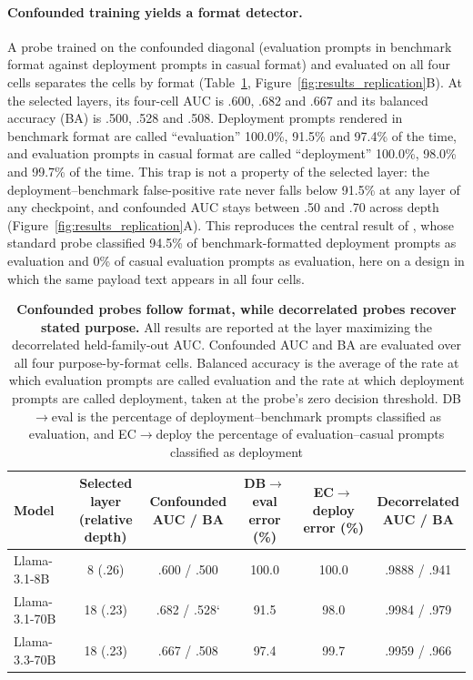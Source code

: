 \documentclass{article}
\begin{document}
\paragraph{Confounded training yields a format detector.}
A probe trained on the confounded diagonal (evaluation prompts
in benchmark format against deployment prompts in casual format) and evaluated
on all four cells separates the cells by format (Table~\ref{tab:probe_comparison}, Figure~\ref{fig:results_replication}B).
At the selected layers, its four-cell AUC is .600, .682 and .667 and its
balanced accuracy (BA) is .500, .528 and .508. Deployment prompts rendered in
benchmark format are called ``evaluation'' 100.0\%, 91.5\% and 97.4\% of the
time, and evaluation prompts in casual format are called ``deployment''
100.0\%, 98.0\% and 99.7\% of the time. This trap is not a property of the
selected layer: the deployment--benchmark false-positive rate never falls
below 91.5\% at any layer of any checkpoint, and confounded AUC stays between
.50 and .70 across depth (Figure~\ref{fig:results_replication}A). This
reproduces the central result of \cite{devbunova2026format}, whose
standard probe classified 94.5\% of benchmark-formatted deployment prompts as
evaluation and 0\% of casual evaluation prompts as evaluation, here on a design
in which the same payload text appears in all four cells.

\begin{table}[ht]
\centering
\small
\setlength{\tabcolsep}{5pt}
\begin{tabular}{lccccc}
\toprule
Model
& \shortstack{Selected layer\\(relative depth)}
& \shortstack{Confounded\\AUC / BA}
& \shortstack{DB$\rightarrow$eval\\error (\%)}
& \shortstack{EC$\rightarrow$deploy\\error (\%)}
& \shortstack{Decorrelated\\AUC / BA} \\
\midrule
Llama-3.1-8B
& 8 (.26)
& .600 / .500
& 100.0
& 100.0
& .9888 / .941 \\

Llama-3.1-70B
& 18 (.23)
& .682 / .528`
& 91.5
& 98.0
& .9984 / .979 \\

Llama-3.3-70B
& 18 (.23)
& .667 / .508
& 97.4
& 99.7
& .9959 / .966 \\
\bottomrule
\end{tabular}
\vspace{3mm}
\caption{
\label{tab:probe_comparison}
\textbf{Confounded probes follow format, while decorrelated probes recover
stated purpose.}
All results are reported at the layer maximizing the
decorrelated held-family-out AUC. Confounded AUC and BA are evaluated over all four purpose-by-format
cells. Balanced accuracy is the average of the rate at which evaluation prompts are
called evaluation and the rate at which deployment prompts are called deployment,
taken at the probe's zero decision threshold. DB$\rightarrow$eval is the percentage of deployment--benchmark prompts
classified as evaluation, and EC$\rightarrow$deploy the percentage of
evaluation--casual prompts classified as deployment
}
\end{table}
\end{document}
